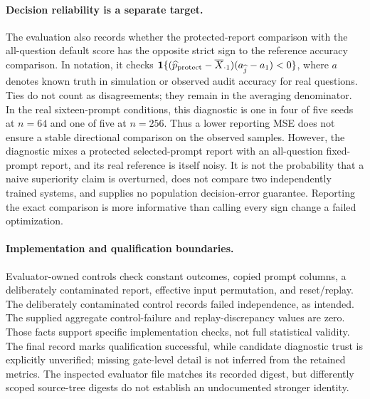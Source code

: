 \documentclass{article}
\begin{document}
\paragraph{Decision reliability is a separate target.}
The evaluation also records whether the protected-report comparison with the all-question default score has the opposite strict sign to the reference accuracy comparison. In notation, it checks
$\mathbf{1}\{(\widehat p_{\rm protect}-\overline X_{\cdot1})(a_{\widehat j}-a_1)<0\}$,
where $a$ denotes known truth in simulation or observed audit accuracy for real questions. Ties do not count as disagreements; they remain in the averaging denominator. In the real sixteen-prompt conditions, this diagnostic is one in four of five seeds at $n=64$ and one of five at $n=256$. Thus a lower reporting MSE does not ensure a stable directional comparison on the observed samples. However, the diagnostic mixes a protected selected-prompt report with an all-question fixed-prompt report, and its real reference is itself noisy. It is not the probability that a naive superiority claim is overturned, does not compare two independently trained systems, and supplies no population decision-error guarantee. Reporting the exact comparison is more informative than calling every sign change a failed optimization.

\paragraph{Implementation and qualification boundaries.}
Evaluator-owned controls check constant outcomes, copied prompt columns, a deliberately contaminated report, effective input permutation, and reset/replay. The deliberately contaminated control records failed independence, as intended. The supplied aggregate control-failure and replay-discrepancy values are zero. Those facts support specific implementation checks, not full statistical validity. The final record marks qualification successful, while candidate diagnostic trust is explicitly unverified; missing gate-level detail is not inferred from the retained metrics. The inspected evaluator file matches its recorded digest, but differently scoped source-tree digests do not establish an undocumented stronger identity.
\end{document}
